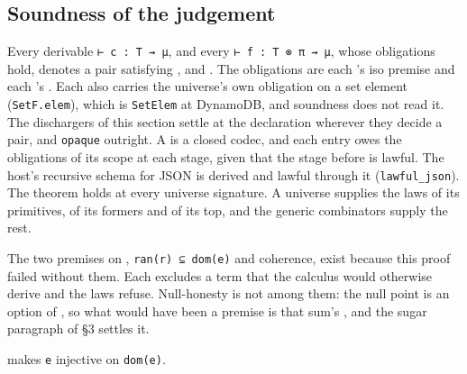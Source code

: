 \subsection{Soundness of the judgement}\label{theorem-soundness}

\begin{theorem}[soundness]
\label{thm:soundness}
\leanok
Every derivable \texttt{⊢\ c\ :\ T\ ⇝\ μ}, and every \texttt{⊢\ f\ :\ T\ ⊗\ π\ ⇝\ μ}, whose obligations hold, denotes a pair
satisfying ,  and . The obligations are each
's iso premise and each 's . Each
 also carries the universe's own obligation on a set element (\texttt{SetF.elem}), which is
\texttt{SetElem} at DynamoDB, and soundness does not read it. The
dischargers of this section settle  at the declaration wherever they decide
a pair,  and \texttt{opaque} outright. A  is a closed codec, and each
entry owes the obligations of its scope at each stage, given that the stage before is lawful. The host's recursive schema for JSON is derived and lawful through it (\texttt{lawful\_json}).
The theorem holds at every universe signature. A universe supplies the laws of its primitives, of its
formers and of its top, and the generic combinators supply the rest.
\end{theorem}

The two premises on , \texttt{ran(r)\ ⊆\ dom(e)} and
coherence, exist because this proof failed without them. Each excludes a term that the calculus
would otherwise derive and the laws refuse. Null-honesty is not
among them: the null point is an option of , so what would have been a
premise is that sum's , and the sugar paragraph of §3 settles it.

\begin{lemma}[injectivity]
\label{lem:injectivity}
\leanok
{} makes \texttt{e} injective on \texttt{dom(e)}.
\end{lemma}

